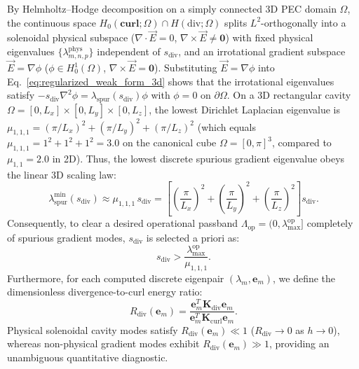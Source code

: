 \documentclass[preprint,12pt]{elsarticle}
\newcommand{\curl}{\nabla \times}
\newcommand{\divg}{\nabla \cdot}
\newcommand{\Hdiv}{H(\text{div};\Omega)}
\begin{document}
By Helmholtz--Hodge decomposition on a simply connected 3D PEC domain $\Omega$, the continuous space $H_0(\mathbf{curl};\Omega) \cap \Hdiv$ splits $L^2$-orthogonally into a solenoidal physical subspace ($\divg\vec{E} = 0$, $\curl\vec{E} \neq \mathbf{0}$) with fixed physical eigenvalues $\{\lambda_{m,n,p}^{\text{phys}}\}$ independent of $s_{\text{div}}$, and an irrotational gradient subspace $\vec{E} = \nabla\phi$ ($\phi \in H_0^1(\Omega)$, $\curl\vec{E} = \mathbf{0}$). Substituting $\vec{E} = \nabla\phi$ into Eq.~\eqref{eq:regularized_weak_form_3d} shows that the irrotational eigenvalues satisfy $-s_{\text{div}}\nabla^2\phi = \lambda_{\text{spur}}(s_{\text{div}})\phi$ with $\phi = 0$ on $\partial\Omega$. On a 3D rectangular cavity $\Omega = [0, L_x]\times[0, L_y]\times[0, L_z]$, the lowest Dirichlet Laplacian eigenvalue is $\mu_{1,1,1} = (\pi/L_x)^2 + (\pi/L_y)^2 + (\pi/L_z)^2$ (which equals $\mu_{1,1,1} = 1^2 + 1^2 + 1^2 = 3.0$ on the canonical cube $\Omega = [0,\pi]^3$, compared to $\mu_{1,1} = 2.0$ in 2D). Thus, the lowest discrete spurious gradient eigenvalue obeys the linear 3D scaling law:
\begin{equation}
    \lambda_{\text{spur}}^{\min}(s_{\text{div}}) \approx \mu_{1,1,1}\,s_{\text{div}} = \left[ \left(\frac{\pi}{L_x}\right)^2 + \left(\frac{\pi}{L_y}\right)^2 + \left(\frac{\pi}{L_z}\right)^2 \right] s_{\text{div}}.
    \label{eq:spurious_scaling_law_3d}
\end{equation}
Consequently, to clear a desired operational passband $\Lambda_{\text{op}} = (0, \lambda_{\max}^{\text{op}}]$ completely of spurious gradient modes, $s_{\text{div}}$ is selected a priori as:
\begin{equation}
    s_{\text{div}} > \frac{\lambda_{\max}^{\text{op}}}{\mu_{1,1,1}}.
    \label{eq:s_div_criterion_3d}
\end{equation}
Furthermore, for each computed discrete eigenpair $(\lambda_m, \mathbf{e}_m)$, we define the dimensionless divergence-to-curl energy ratio:
\begin{equation}
    R_{\text{div}}(\mathbf{e}_m) = \frac{\mathbf{e}_m^T \mathbf{K}_{\text{div}} \mathbf{e}_m}{\mathbf{e}_m^T \mathbf{K}_{\text{curl}} \mathbf{e}_m}.
    \label{eq:R_div_metric_3d}
\end{equation}
Physical solenoidal cavity modes satisfy $R_{\text{div}}(\mathbf{e}_m) \ll 1$ ($R_{\text{div}} \to 0$ as $h \to 0$), whereas non-physical gradient modes exhibit $R_{\text{div}}(\mathbf{e}_m) \gg 1$, providing an unambiguous quantitative diagnostic.
\end{document}
